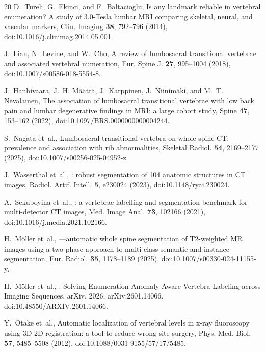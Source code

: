 \documentclass[aapm,mph,amsmath,amssymb,preprint,linenumbers]{revtex4-2}
\begin{document}
\begin{thebibliography}{20}
D.~Tureli, G.~Ekinci, and F.~Baltacioglu,
\newblock Is any landmark reliable in vertebral enumeration? {A} study of 3.0-{Tesla} lumbar {MRI} comparing skeletal, neural, and vascular markers,
\newblock Clin. Imaging {\bf 38}, 792--796 (2014),
\newblock doi:10.1016/j.clinimag.2014.05.001.

J.~Lian, N.~Levine, and W.~Cho,
\newblock A review of lumbosacral transitional vertebrae and associated vertebral numeration,
\newblock Eur. Spine J. {\bf 27}, 995--1004 (2018),
\newblock doi:10.1007/s00586-018-5554-8.

J.~Hanhivaara, J.~H. M{\"a}{\"a}tt{\"a}, J.~Karppinen, J.~Niinim{\"a}ki, and M.~T. Nevalainen,
\newblock The association of lumbosacral transitional vertebrae with low back pain and lumbar degenerative findings in {MRI}: a large cohort study,
\newblock Spine {\bf 47}, 153--162 (2022),
\newblock doi:10.1097/BRS.0000000000004244.

S.~Nagata et~al.,
\newblock Lumbosacral transitional vertebra on whole-spine {CT}: prevalence and association with rib abnormalities,
\newblock Skeletal Radiol. {\bf 54}, 2169--2177 (2025),
\newblock doi:10.1007/s00256-025-04952-z.

J.~Wasserthal et~al.,
: robust segmentation of 104 anatomic structures in {CT} images,
\newblock Radiol. Artif. Intell. {\bf 5}, e230024 (2023),
\newblock doi:10.1148/ryai.230024.

A.~Sekuboyina et~al.,
: a vertebrae labelling and segmentation benchmark for multi-detector {CT} images,
\newblock Med. Image Anal. {\bf 73}, 102166 (2021),
\newblock doi:10.1016/j.media.2021.102166.

H.~M{\"o}ller et~al.,
—automatic whole spine segmentation of {T2}-weighted {MR} images using a two-phase approach to multi-class semantic and instance segmentation,
\newblock Eur. Radiol. {\bf 35}, 1178--1189 (2025),
\newblock doi:10.1007/s00330-024-11155-y.

H.~M{\"o}ller et~al.,
: Solving Enumeration Anomaly Aware Vertebra Labeling across Imaging Sequences,
\newblock arXiv, 2026,
\newblock arXiv:2601.14066. doi:10.48550/ARXIV.2601.14066.

Y.~Otake et~al.,
\newblock Automatic localization of vertebral levels in x-ray fluoroscopy using {3D-2D} registration: a tool to reduce wrong-site surgery,
\newblock Phys. Med. Biol. {\bf 57}, 5485--5508 (2012),
\newblock doi:10.1088/0031-9155/57/17/5485.


\end{thebibliography}
\end{document}
